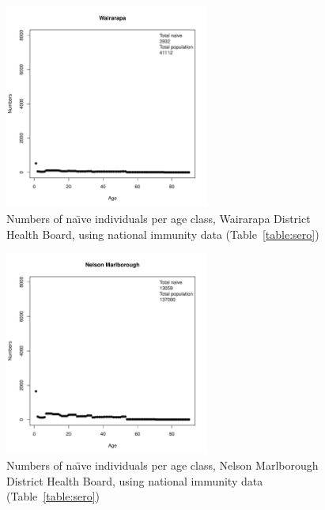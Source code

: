 \documentclass{article}
\begin{document}
\begin{figure}[H]
     \begin{center}
     \includegraphics[width=0.6\textwidth]{dhb15.pdf}
     \end{center}
     \caption{Numbers of na\"{\i}ve individuals per age class, Wairarapa District Health Board, using national immunity data (Table~\autoref{table:sero})}
     \label{fig:Wairarapa}
\end{figure}

\begin{figure}[H]
     \begin{center}
     \includegraphics[width=0.6\textwidth]{dhb16.pdf}
     \end{center}
     \caption{Numbers of na\"{\i}ve individuals per age class, Nelson Marlborough District Health Board, using national immunity data (Table~\autoref{table:sero})}
     \label{fig:NelsonMarlborough}
\end{figure}
\end{document}
